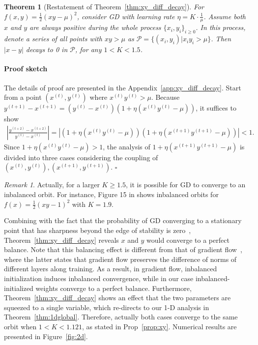\documentclass{article}
\newcommand{\citep}[1]{\cite{#1}}
\theoremstyle{plain}
\newtheorem{theorem}{Theorem}
\theoremstyle{remark}
\newtheorem*{remark}{Remark}
\newenvironment{sketch}{\paragraph{Proof sketch}}{\hfill$\square$}
\newcommand{\red}[1]{{\color{black}#1}}
\newcommand{\T}[1]{^{(#1)}}
\def\t{^{(t)}}
\def\tt{^{(t+1)}}
\begin{document}
\begin{theorem}[Restatement of Theorem~\ref{thm:xy_diff_decay}]
For $f(x,y)=\frac{1}{2}\left(xy-\mu\right)^2$, consider GD with learning rate $\eta=K\cdot\frac{1}{\mu}$. Assume both $x$ and $y$ are always positive during the whole process $\{x_i,y_i\}_{i\ge 0}$. In this process, denote a series of all points with $xy>\mu$ as $\mathcal{P}=\{(x_i,y_i)|x_i y_i>\mu\}$. Then $|x-y|$ \red{decays to 0} in $\mathcal{P}$, for any $1<K<1.5$.
\label{thm:xy_diff_decay_repeat}
\end{theorem}

\begin{sketch}
The details of proof are presented in the Appendix~\ref{app:xy_diff_decay}. Start from a point $(x\t, y\t)$ where $x\t y\t>\mu$. Because $y\tt-x\tt=(y\t-x\t)(1+\eta(x\t y\t-\mu))$, it suffices to show 
\begin{align}
 \left|\frac{y\T{t+2}-x\T{t+2}}{y\t-x\t}\right|=|(1+\eta(x\t y\t-\mu))(1+\eta(x\tt y\tt-\mu))| < 1. \label{eq:ratiotp2}
\end{align}
Since $1+\eta(x\t y\t-\mu)>1$, the analysis of $1+\eta(x\tt y\tt-\mu)$ is divided into three cases considering the coupling of $(x\t,y\t), (x\tt, y\tt)$. 
\end{sketch}

\begin{remark}
Actually, for a larger $K\ge 1.5$, it is possible for GD to converge to an inbalanced orbit. For instance, Figure 15 in \citep{wang2021large} shows inbalanced orbits for $f(x)=\frac{1}{2}(xy-1)^2$ with $K=1.9$.
\end{remark}

Combining with the fact that the probability of GD converging to a stationary point that has sharpness beyond the edge of stability is zero~\citep{ahn2022understanding}, Theorem~\ref{thm:xy_diff_decay} reveals $x$ and $y$ would converge to a perfect balance. Note that this balancing effect is different from that of gradient flow~\citep{du2018algorithmic}, where the latter states that gradient flow preserves the difference of norms of different layers along training. As a result, in gradient flow, inbalanced initialization induces inbalanced convergence, while in our case inbalanced-initialized weights converge to a perfect balance. Furthermore, Theorem~\ref{thm:xy_diff_decay} shows an effect that the two parameters are squeezed to a single variable, which re-directs to our 1-D analysis in Theorem~\ref{thm:1dglobal}. Therefore, actually both cases converge to the same orbit when $1<K< 1.121$, as stated in Prop~\ref{prop:xy}. Numerical results are presented in Figure~\ref{fig:2d}.
\end{document}

